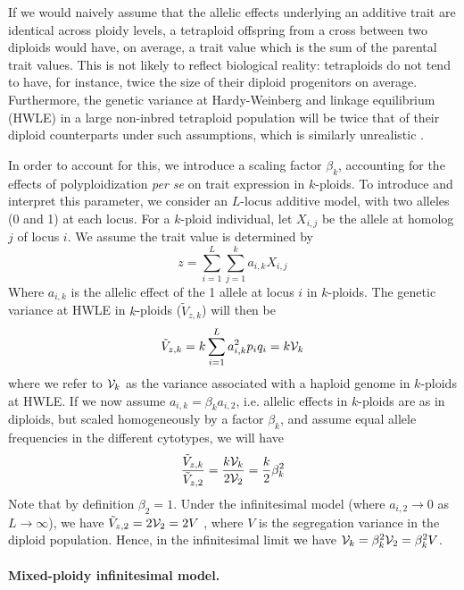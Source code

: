 \documentclass[12pt,a4paper]{article}
\begin{document}
If we would naively assume that the allelic effects underlying an additive
trait are identical across ploidy levels, 
a tetraploid offspring from a cross between two diploids would have, on average,
a trait value which is the sum of the parental trait values.
This is not likely to reflect biological reality: tetraploids do not tend to
have, for instance, twice the size of their diploid progenitors on average.
Furthermore, the genetic variance at Hardy-Weinberg and linkage equilibrium
(HWLE) in a large non-inbred tetraploid population will be twice that of their
diploid counterparts under such assumptions, which is similarly unrealistic
\citep{clo2022}.

In order to account for this, we introduce a scaling factor $\beta_k$,
accounting for the effects of polyploidization \textit{per se} on trait
expression in $k$-ploids.
To introduce and interpret this parameter, we consider an $L$-locus additive
model, with two alleles (0 and 1) at each locus.
For a $k$-ploid individual, let $X_{i,j}$ be the allele at homolog $j$ of locus
$i$.
We assume the trait value is determined by
\begin{equation}
  z = \sum_{i=1}^L\sum_{j=1}^k a_{i,k} X_{i,j}
\end{equation}
Where $a_{i,k}$ is the allelic effect of the 1 allele at locus $i$ in
$k$-ploids.
The genetic variance at HWLE in $k$-ploids ($\tilde{V}_{z,k}$) will then be
\begin{equation}
  \tilde{V}_{z,k} = k\sum_{i=1}^L a_{i,k}^2 p_iq_i = k\mathcal{V}_{k}
\end{equation}
where we refer to $\mathcal{V}_{k}$ as the variance associated with a haploid genome in
$k$-ploids at HWLE.
If we now assume $a_{i,k} = \beta_k a_{i,2}$, i.e. allelic effects in $k$-ploids
are as in diploids, but scaled homogeneously by a factor $\beta_k$, and assume
equal allele frequencies in the different cytotypes, we will have
\begin{equation}
  \frac{\tilde{V}_{z,k}}{\tilde{V}_{z,2}} 
  = \frac{k\mathcal{V}_{k}}{2\mathcal{V}_{2}} = \frac{k}{2} \beta_{k}^2
\end{equation}
Note that by definition $\beta_2=1$.
Under the infinitesimal model (where $a_{i,2} \rightarrow 0$ as $L\rightarrow
\infty$), we have $\tilde{V}_{z,2} = 2\mathcal{V}_{2} = 2V$ \citep{barton2017}, where
$V$ is the segregation variance in the diploid population.
Hence, in the infinitesimal limit we have $\mathcal{V}_{k} = \beta_k^2 \mathcal{V}_{2} =
\beta_k^2 V$.


\paragraph{Mixed-ploidy infinitesimal model.}
\end{document}
